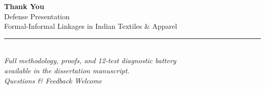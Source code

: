 \documentclass[aspectratio=169, 10pt]{beamer}
\begin{document}
\begin{frame}
\begin{center}
\vspace{10pt}
{\Large \textbf{Thank You}}\\[16pt]
{\large Defense Presentation}\\[6pt]
{\normalsize Formal-Informal Linkages in Indian Textiles \& Apparel}\\[20pt]
\rule{0.5\textwidth}{0.4pt}\\[12pt]
{\small
  \textit{Full methodology, proofs, and 12-test diagnostic battery\\[2pt] available in the dissertation manuscript.}
}\\[20pt]
\textit{Questions \& Feedback Welcome}
\end{center}
\end{frame}
\end{document}
